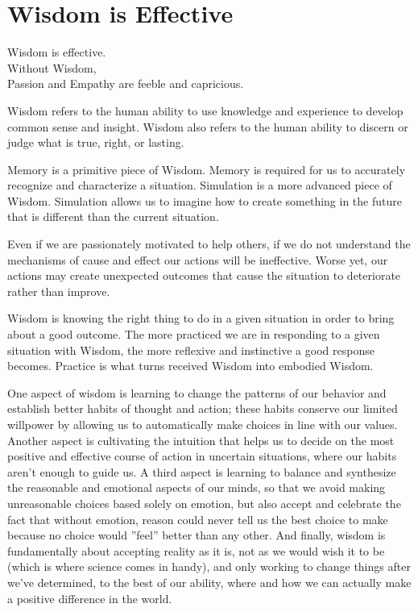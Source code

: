 \documentclass[ebook,12pt,openany,twoside]{memoir}
\newcommand{\tab}{\hspace*{2em}}
\newcommand{\imagefacingchapter}[1]{
  \cleartoverso
  \clearpage \null
  \thispagestyle{cleared}
  \AddToShipoutPictureBG*{%
    \AtStockLowerLeft{%
      \texttt{[image: \#1]}
    }
  }
  \clearpage
}
\begin{document}
\imagefacingchapter{images/WisdomIsEffective}
\chapter{Wisdom is Effective}

\setlength\epigraphwidth{3.8in}
\epigraph{
  Wisdom is effective.\\
  Without Wisdom,\\
  \tab Passion and Empathy are feeble and capricious.
}{}

Wisdom refers to the human ability to use knowledge and experience to develop
common sense and insight. Wisdom also refers to the human ability to discern or
judge what is true, right, or lasting.

Memory is a primitive piece of Wisdom. Memory is required for us to accurately recognize and characterize a situation.  Simulation is a more advanced piece of Wisdom. Simulation allows us to imagine how to create something in the future that is different than the current situation.

Even if we are passionately motivated to help others, if we do not understand the mechanisms of cause and effect our actions will be ineffective.  Worse yet, our actions may create unexpected outcomes that cause the situation to deteriorate rather than improve.

Wisdom is knowing the right thing to do in a given situation in order to bring about a good outcome.  The more practiced we are in responding to a given situation with Wisdom, the more reflexive and instinctive a good response becomes.  Practice is what turns received Wisdom into embodied Wisdom.

One aspect of wisdom is learning to change the patterns of our behavior
and establish better habits of thought and action; these habits conserve our
limited willpower by allowing us to automatically make choices in line with our
values. Another aspect is cultivating the intuition that helps us to decide on
the most positive and effective course of action in uncertain situations, where
our habits aren't enough to guide us. A third aspect is learning to balance and
synthesize the reasonable and emotional aspects of our minds, so that we avoid
making unreasonable choices based solely on emotion, but also accept and
celebrate the fact that without emotion, reason could never tell us the best
choice to make because no choice would ''feel'' better than any other. And
finally, wisdom is fundamentally about accepting reality as it is, not as we
would wish it to be (which is where science comes in handy), and only working
to change things after we've determined, to the best of our ability, where and
how we can actually make a positive difference in the world.
\end{document}
